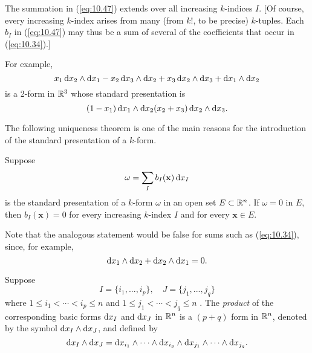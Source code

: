The summation in (\ref{eq:10.47}) extends over all increasing $k$-indices $I$.
[Of course, every increasing $k$-index arises from many (from $k!$, to be precise) $k$-tuples. 
Each $b_I$ in (\ref{eq:10.47}) 
may thus be a sum of several of the coefficients that occur in (\ref{eq:10.34}).]

For example,
\begin{equation*}
    x_1 \d x_2 \wedge \d x_1 - 
    x_2 \d x_3 \wedge \d x_2 + 
    x_3 \d x_2 \wedge \d x_3 + 
        \d x_1 \wedge \d x_2  
\end{equation*}
is a 2-form in ${\protect\mathbb R}^3$ whose standard presentation is 
\begin{equation*}
    (1-x_1) \d x_1 \wedge \d x_2 
    (x_2 + x_3) \d x_2 \wedge \d x_3 .
\end{equation*}

The following uniqueness theorem is one of the main reasons for the
introduction of the standard presentation of a $k$-form.

\begin{thm}
    \label{thm:10.15}
    Suppose 
    \begin{equation}
        \label{eq:10.48}
        \omega = \sum_{I} b_I (\mathbf{x}) \d x_I
    \end{equation}
    is the standard presentation of a $k$-form $\omega$ in an open set $E \subset {\protect\mathbb R}^n$. 
    If $\omega = 0$ in $E$, 
    then $b_I(\mathbf{x}) = 0$ for every increasing $k$-index $I$ and for every $\mathbf{x} \in E$.
\end{thm}

Note that the analogous statement would be false for sums such as (\ref{eq:10.34}),
since, for example,
\begin{equation*}
    \d x_1 \wedge \d x_2 +
    \d x_2 \wedge \d x_1 = 0.
\end{equation*}


\begin{mydef}
    Suppose 
    \begin{equation}
        \label{eq:10.51}
        I = \{i_1,...,i_p\},
        \quad 
        J = \{j_1,...,j_q\}
    \end{equation}
    where $1 \leq i_1 < \cdots < i_p \leq n$ 
    and $1 \leq j_1 < \cdots < j_q \leq n$ .
    The \emph{product} of the corresponding basic forms $\d x_I$ and $\d x_J$ in ${\protect\mathbb R}^n$ is a $(p + q)$ form in ${\protect\mathbb R}^n$, denoted by the symbol $\d x_I \wedge \d x_J$, and defined by 
    \begin{equation}
        \label{eq:10.52}
        \d x_I \wedge \d x_J = 
        \d x_{i_1} \wedge \cdots \wedge
        \d x_{i_p} \wedge 
        \d x_{j_1} \wedge \cdots \wedge
        \d x_{j_q}.
    \end{equation}
\end{mydef}

